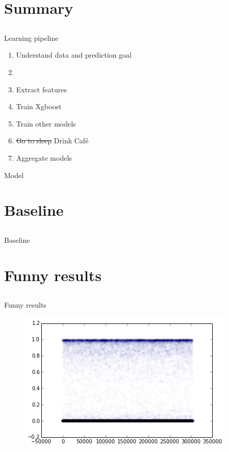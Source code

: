 \section{Summary} \subsection{}\label{}

\begin{frame}{Learning pipeline}
	
	\begin{enumerate}
		\item Understand data and prediction goal
		\item 
		\item Extract features
		\item Train Xgboost
		\item Train other models
		\item \sout{Go to sleep} Drink Café 
		\item Aggregate models
	\end{enumerate}
	
	Model
		
\end{frame}


\section{Baseline} \subsection{}\label{}

\begin{frame}{Baseline}
	
\end{frame}

\section{Funny results} \subsection{}\label{}

\begin{frame}{Funny results}
	
	\begin{figure}[H]
		\centering
		\includegraphics[width=0.7\linewidth]{images/a.png}
	\end{figure}
	
\end{frame}




